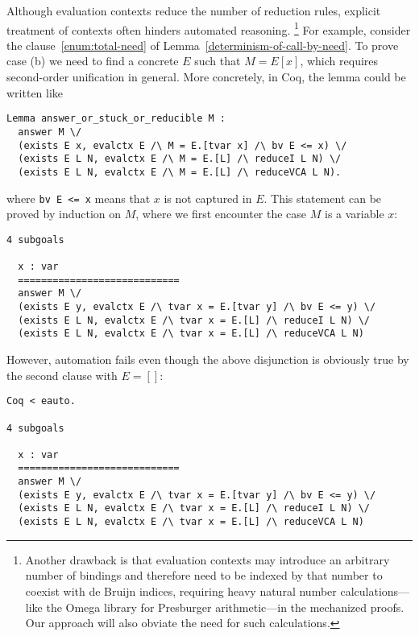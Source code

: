 \documentclass[english]{sumiilab-paper}
\newcommand{\lemmaname}{Lemma}
\begin{document}
Although evaluation contexts reduce the number of reduction rules,
explicit treatment of contexts often hinders automated reasoning.%
\footnote{\label{the-footnote}Another drawback is that evaluation contexts may introduce an arbitrary number of bindings and therefore need to be indexed by that number to coexist with de Bruijn indices,
requiring heavy natural number calculations---like the Omega \cite{Coq:manual} library for Presburger arithmetic---in the mechanized proofs.
Our approach will also obviate the need for such calculations.}
For example, consider the clause~\ref{enum:total-need} of \lemmaname~\ref{determinism-of-call-by-need}.
To prove case (b) %
we need to find a concrete $E$ such that $M=E[x]$, which requires second-order unification \cite{Goldfarb81} in general.  More concretely, in Coq, the lemma could be written like
\begin{verbatim}
Lemma answer_or_stuck_or_reducible M :
  answer M \/
  (exists E x, evalctx E /\ M = E.[tvar x] /\ bv E <= x) \/
  (exists E L N, evalctx E /\ M = E.[L] /\ reduceI L N) \/
  (exists E L N, evalctx E /\ M = E.[L] /\ reduceVCA L N).
\end{verbatim}
where \verb|bv E <= x| means that $x$ is not captured in $E$.
This statement can be proved by induction on $M$, where we first encounter the case $M$ is a variable $x$:
\begin{verbatim}
4 subgoals

  x : var
  ============================
  answer M \/
  (exists E y, evalctx E /\ tvar x = E.[tvar y] /\ bv E <= y) \/
  (exists E L N, evalctx E /\ tvar x = E.[L] /\ reduceI L N) \/
  (exists E L N, evalctx E /\ tvar x = E.[L] /\ reduceVCA L N)
\end{verbatim}
However, automation fails even though the above disjunction is obviously true by the second clause with $E = []$:
\begin{verbatim}
Coq < eauto.

4 subgoals

  x : var
  ============================
  answer M \/
  (exists E y, evalctx E /\ tvar x = E.[tvar y] /\ bv E <= y) \/
  (exists E L N, evalctx E /\ tvar x = E.[L] /\ reduceI L N) \/
  (exists E L N, evalctx E /\ tvar x = E.[L] /\ reduceVCA L N)
\end{verbatim}
\end{document}
